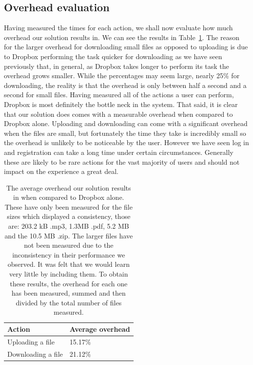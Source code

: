 \documentclass[12pt, titlepage]{article}
\begin{document}
\subsection{Overhead evaluation}
Having measured the times for each action, we shall now evaluate how much overhead our solution results in. We can see the results in Table~\ref{tab:overhead}. The reason for the larger overhead for downloading small files as opposed to uploading is due to Dropbox performing the task quicker for downloading as we have seen previously that, in general, as Dropbox takes longer to perform its task the overhead grows smaller. While the percentages may seem large, nearly 25\% for downloading, the reality is that the overhead is only between half a second and a second for small files.
\newline \indent Having measured all of the actions a user can perform, Dropbox is most definitely the bottle neck in the system. That said, it is clear that our solution does comes with a measurable overhead when compared to Dropbox alone. Uploading and downloading can come with a significant overhead when the files are small, but fortunately the time they take is incredibly small so the overhead is unlikely to be noticeable by the user. However we have seen log in and registration can take a long time under certain circumstances. Generally these are likely to be rare actions for the vast majority of users and should not impact on the experience a great deal.

\begin{table}[H]
	\begin{center}
    	\begin{tabular}{ | l | l |}
    \hline
     \textbf{Action} & \textbf{Average overhead} \\ \hline
      Uploading a file & 15.17\% \\ \hline
      Downloading a file & 21.12\%	\\ \hline    
    \end{tabular}
    \caption{The average overhead our solution results in when compared to Dropbox alone. These have only been measured for the file sizes which displayed a consistency, those are: 203.2 kB .mp3, 1.3MB .pdf, 5.2 MB and the 10.5 MB .zip. The larger files have not been measured due to the inconsistency in their performance we observed. It was felt that we would learn very little by including them.
\newline \indent To obtain these results, the overhead for each one has been measured, summed and then divided by the total number of files measured.}
    \label{tab:overhead}
   \end{center}
\end{table}
\end{document}
